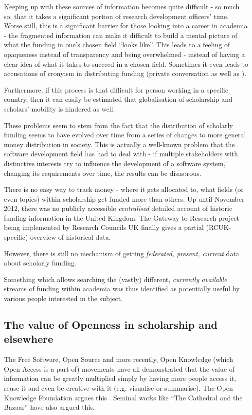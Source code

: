 Keeping up with these sources of information becomes quite difficult - so much so, that it takes a significant portion of research development officers' time. Worse still, this is a significant barrier for those looking into a career in academia - the fragmented information can make it difficult to build a mental picture of what the funding in one's chosen field ``looks like''. This leads to a feeling of opaqueness instead of transparency and being overwhelmed - instead of having a clear idea of what it takes to succeed in a chosen field. Sometimes it even leads to accusations of cronyism in distributing funding (private conversation as well as \cite{cronyism1, cronyism2}).

Furthermore, if this process is that difficult for person working in a specific country, then it can easily be estimated that globalisation of scholarship and scholars' mobility is hindered as well.

These problems seem to stem from the fact that the distribution of scholarly funding seems to have evolved over time from a series of changes to more general money distribution in society. This is actually a well-known problem that the software development field has had to deal with - if multiple stakeholders with distinctive interests try to influence the development of a software system, changing its requirements over time, the results can be disastrous.

There is no easy way to track money - where it gets allocated to, what fields (or even topics) within scholarship get funded more than others. Up until November 2012, there was no publicly accessible \emph{centralised} detailed account of historic funding information in the United Kingdom. The Gateway to Research project being implemented by Research Councils UK finally gives a partial (RCUK-specific) overview of historical data.

However, there is still no mechanism of getting \emph{federated, present, current} data about scholarly funding.

Something which allows searching the (vastly) different, \emph{currently available} streams of funding within academia was thus identified as potentially useful by various people interested in the subject.

\subsection{The value of Openness in scholarship and elsewhere}
The Free Software, Open Source and more recently, Open Knowledge (which Open Access is a part of) movements have all demonstrated that the value of information can be greatly multiplied simply by having more people access it, reuse it and even be creative with it (e.g. visualise or summarise). The Open Knowledge Foundation argues this \cite{okfn-vision}. Seminal works like ``The Cathedral and the Bazaar'' \cite{catb} have also argued this.

